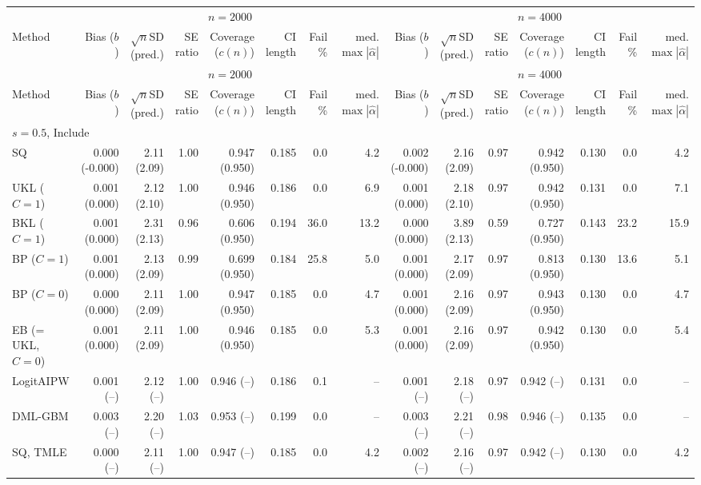 \begin{tabular}{lrrrrrrrrrrrrrr}
\hline
 & \multicolumn{7}{c}{$n=2000$} & \multicolumn{7}{c}{$n=4000$} \\
Method & Bias ($b$) & $\sqrt{n}$SD (pred.) & SE ratio & Coverage ($c(n)$) & CI length & Fail \% & med. $\max|\widehat\alpha|$ & Bias ($b$) & $\sqrt{n}$SD (pred.) & SE ratio & Coverage ($c(n)$) & CI length & Fail \% & med. $\max|\widehat\alpha|$ \\
\hline
\endfirsthead
\hline
 & \multicolumn{7}{c}{$n=2000$} & \multicolumn{7}{c}{$n=4000$} \\
Method & Bias ($b$) & $\sqrt{n}$SD (pred.) & SE ratio & Coverage ($c(n)$) & CI length & Fail \% & med. $\max|\widehat\alpha|$ & Bias ($b$) & $\sqrt{n}$SD (pred.) & SE ratio & Coverage ($c(n)$) & CI length & Fail \% & med. $\max|\widehat\alpha|$ \\
\hline
\endhead
\multicolumn{15}{l}{$s=0.5$, Include} \\
SQ & 0.000 (-0.000) & 2.11 (2.09) & 1.00 & 0.947 (0.950) & 0.185 & 0.0 & 4.2 & 0.002 (-0.000) & 2.16 (2.09) & 0.97 & 0.942 (0.950) & 0.130 & 0.0 & 4.2 \\
UKL ($C=1$) & 0.001 (0.000) & 2.12 (2.10) & 1.00 & 0.946 (0.950) & 0.186 & 0.0 & 6.9 & 0.001 (0.000) & 2.18 (2.10) & 0.97 & 0.942 (0.950) & 0.131 & 0.0 & 7.1 \\
BKL ($C=1$) & 0.001 (0.000) & 2.31 (2.13) & 0.96 & 0.606 (0.950) & 0.194 & 36.0 & 13.2 & 0.000 (0.000) & 3.89 (2.13) & 0.59 & 0.727 (0.950) & 0.143 & 23.2 & 15.9 \\
BP ($C=1$) & 0.001 (0.000) & 2.13 (2.09) & 0.99 & 0.699 (0.950) & 0.184 & 25.8 & 5.0 & 0.001 (0.000) & 2.17 (2.09) & 0.97 & 0.813 (0.950) & 0.130 & 13.6 & 5.1 \\
BP ($C=0$) & 0.000 (0.000) & 2.11 (2.09) & 1.00 & 0.947 (0.950) & 0.185 & 0.0 & 4.7 & 0.001 (0.000) & 2.16 (2.09) & 0.97 & 0.943 (0.950) & 0.130 & 0.0 & 4.7 \\
EB (= UKL, $C=0$) & 0.001 (0.000) & 2.11 (2.09) & 1.00 & 0.946 (0.950) & 0.185 & 0.0 & 5.3 & 0.001 (0.000) & 2.16 (2.09) & 0.97 & 0.942 (0.950) & 0.130 & 0.0 & 5.4 \\
LogitAIPW & 0.001 (--) & 2.12 (--) & 1.00 & 0.946 (--) & 0.186 & 0.1 & -- & 0.001 (--) & 2.18 (--) & 0.97 & 0.942 (--) & 0.131 & 0.0 & -- \\
DML-GBM & 0.003 (--) & 2.20 (--) & 1.03 & 0.953 (--) & 0.199 & 0.0 & -- & 0.003 (--) & 2.21 (--) & 0.98 & 0.946 (--) & 0.135 & 0.0 & -- \\
SQ, TMLE & 0.000 (--) & 2.11 (--) & 1.00 & 0.947 (--) & 0.185 & 0.0 & 4.2 & 0.002 (--) & 2.16 (--) & 0.97 & 0.942 (--) & 0.130 & 0.0 & 4.2 \\

\end{tabular}
